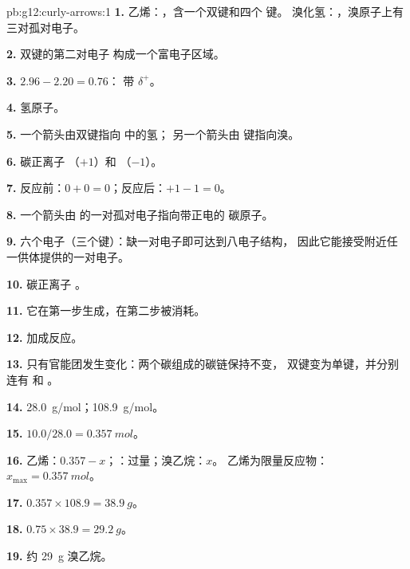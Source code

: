\begin{solution}{pb:g12:curly-arrows:1}
\textbf{1.} 乙烯：，含一个双键和四个  键。
溴化氢：，溴原子上有三对孤对电子。

\textbf{2.} 双键的第二对电子
构成一个富电子区域。

\textbf{3.} $2.96 - 2.20 = 0.76$： 带 $\delta^+$。

\textbf{4.} 氢原子。

\textbf{5.} 一个箭头由双键指向  中的氢；
另一个箭头由  键指向溴。

\textbf{6.} 碳正离子 （$+1$）和 （$-1$）。

\textbf{7.} 反应前：$0 + 0 = 0$；反应后：$+1 - 1 = 0$。

\textbf{8.} 一个箭头由  的一对孤对电子指向带正电的
碳原子。

\textbf{9.} 六个电子（三个键）：缺一对电子即可达到八电子结构，
因此它能接受附近任一供体提供的一对电子。

\textbf{10.} 碳正离子 。

\textbf{11.} 它在第一步生成，在第二步被消耗。

\textbf{12.} 加成反应。

\textbf{13.} 只有官能团发生变化：两个碳组成的碳链保持不变，
双键变为单键，并分别连有  和 。

\textbf{14.} \qty{28.0}{g/mol}；\qty{108.9}{g/mol}。

\textbf{15.} $10.0 / 28.0 = \qty{0.357}{mol}$。

\textbf{16.} 乙烯：$0.357 - x$；：过量；溴乙烷：$x$。
乙烯为限量反应物：$x_{\max} = \qty{0.357}{mol}$。

\textbf{17.} $0.357 \times 108.9 = \qty{38.9}{g}$。

\textbf{18.} $0.75 \times 38.9 = \qty{29.2}{g}$。

\textbf{19.} 约 \qty{29}{g} 溴乙烷。
\end{solution}
